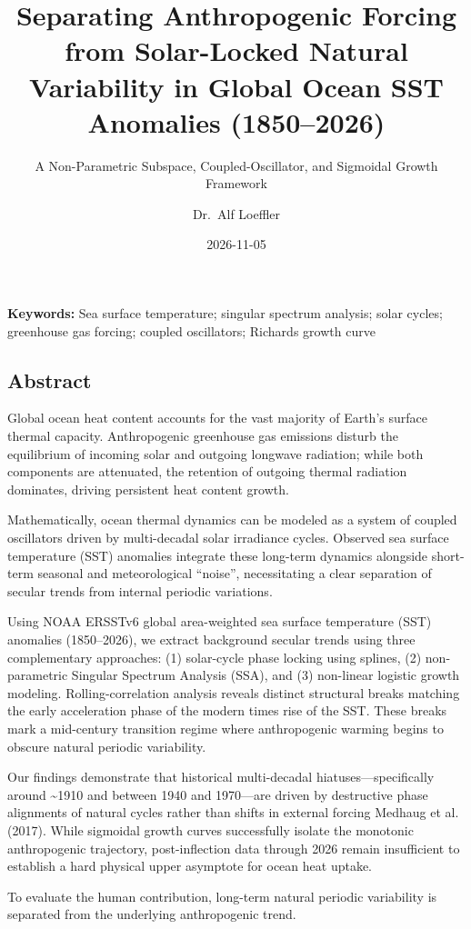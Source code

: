 \documentclass[
  letterpaper,
  DIV=11,
  numbers=noendperiod]{scrartcl}
\title{Separating Anthropogenic Forcing from Solar-Locked Natural
Variability in Global Ocean SST Anomalies (1850--2026)}
\subtitle{A Non-Parametric Subspace, Coupled-Oscillator, and Sigmoidal
Growth Framework}
\author{Dr.~Alf Loeffler}
\date{2026-11-05}
\begin{document}
\maketitle


\textbf{Keywords:} Sea surface temperature; singular spectrum analysis;
solar cycles; greenhouse gas forcing; coupled oscillators; Richards
growth curve

\subsection{Abstract}\label{abstract}

Global ocean heat content accounts for the vast majority of Earth's
surface thermal capacity. Anthropogenic greenhouse gas emissions disturb
the equilibrium of incoming solar and outgoing longwave radiation; while
both components are attenuated, the retention of outgoing thermal
radiation dominates, driving persistent heat content growth.

Mathematically, ocean thermal dynamics can be modeled as a system of
coupled oscillators driven by multi-decadal solar irradiance cycles.
Observed sea surface temperature (SST) anomalies integrate these
long-term dynamics alongside short-term seasonal and meteorological
``noise'', necessitating a clear separation of secular trends from
internal periodic variations.

Using NOAA ERSSTv6 global area-weighted sea surface temperature (SST)
anomalies (1850--2026), we extract background secular trends using three
complementary approaches: (1) solar-cycle phase locking using splines,
(2) non-parametric Singular Spectrum Analysis (SSA), and (3) non-linear
logistic growth modeling. Rolling-correlation analysis reveals distinct
structural breaks matching the early acceleration phase of the modern
times rise of the SST. These breaks mark a mid-century transition regime
where anthropogenic warming begins to obscure natural periodic
variability.

Our findings demonstrate that historical multi-decadal
hiatuses---specifically around \textasciitilde1910 and between 1940 and
1970---are driven by destructive phase alignments of natural cycles
rather than shifts in external forcing Medhaug et al. (2017). While
sigmoidal growth curves successfully isolate the monotonic anthropogenic
trajectory, post-inflection data through 2026 remain insufficient to
establish a hard physical upper asymptote for ocean heat uptake.

To evaluate the human contribution, long-term natural periodic
variability is separated from the underlying anthropogenic trend.
\end{document}
